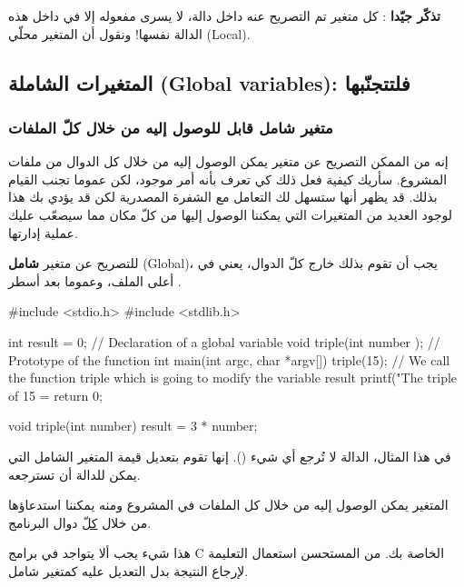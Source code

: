 \textbf{تذكّر جيّدا}
: كل متغير تم التصريح عنه داخل دالة، لا يسرى مفعوله إلا في داخل هذه الدالة نفسها! ونقول أن المتغير محلّي
(\textenglish{Local}).

\subsection{المتغيرات الشاملة (\textenglish{Global variables}): فلتتجنّبها}

\subsubsection{متغير شامل قابل للوصول إليه من خلال كلّ الملفات}

إنه من الممكن التصريح عن متغير يمكن الوصول إليه من خلال كل الدوال من ملفات المشروع.
سأريك كيفية فعل ذلك كي تعرف بأنه أمر موجود، لكن عموما تجنب القيام بذلك.
قد يظهر أنها ستسهل لك التعامل مع الشفرة المصدرية لكن قد يؤدي بك هذا لوجود العديد من المتغيرات التي يمكننا الوصول إليها من كلّ مكان مما سيصعّب عليك عملية إدارتها.

للتصريح عن متغير
\textbf{شامل}
(\textenglish{Global})،
يجب أن تقوم بذلك خارج كلّ الدوال، يعني في أعلى الملف، وعموما بعد أسطر .

\begin{Csource}
#include <stdio.h>
#include <stdlib.h>

int result = 0; // Declaration of a global variable
void triple(int number ); // Prototype of the function
int main(int argc, char *argv[])
{
	triple(15); // We call the function triple which is going to modify the variable result
	printf("The triple of 15 = %
	return 0;
}

void triple(int number)
{
	result = 3 * number;
}
\end{Csource}

في هذا المثال، الدالة
لا تُرجع أي شيء
().
إنها تقوم بتعديل قيمة المتغير الشامل
التي يمكن للدالة
أن تسترجعه.

المتغير
يمكن الوصول إليه من خلال كل الملفات في المشروع ومنه يمكننا استدعاؤها من خلال
\underline{كلّ}
دوال البرنامج.

\begin{warning}
  هذا شيء يجب ألا يتواجد في برامج \textenglish{C}
الخاصة بك. من المستحسن استعمال التعليمة
لإرجاع النتيجة بدل التعديل عليه كمتغير شامل.
\end{warning}

